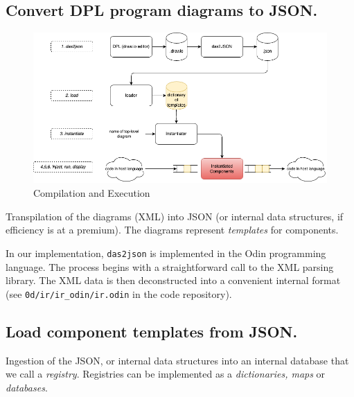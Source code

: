 \documentclass[10pt,anonymous,review]{acmart}
\begin{document}
\subsection{Convert DPL program diagrams to JSON.}
\vspace{0.2\baselineskip}

\begin{figure}[h]
    \centering
    \includegraphics[trim=0 0cm 0 0, clip, scale=0.4]{./media/full.png}
    \caption{Compilation and Execution}
    \label{fig:full}
\end{figure}

\vspace{0.1\baselineskip}


  Transpilation of the diagrams (XML) into JSON (or internal data structures, if efficiency is at a premium). The diagrams represent \emph{templates} for components.
  
  In our implementation, \texttt{das2json} is implemented\cite{d2jrepo} in the Odin programming language. The process begins with a straightforward call to the XML parsing library. The XML data is then deconstructed into a convenient internal format (see \texttt{0d/ir/ir\_odin/ir.odin} in the code repository).
%
  
\subsection{Load component templates from JSON.}
  Ingestion of the JSON, or internal data structures into an internal database that we call a \emph{registry}. Registries can be implemented as a \emph{dictionaries, maps} or \emph{databases}.
%
\end{document}
